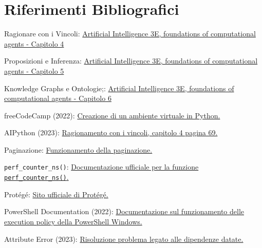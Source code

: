 \documentclass[12pt, letterpaper]{article}
\begin{document}
\newpage

\section{Riferimenti Bibliografici}

\begin{thebibliography}{100}
      Ragionare con i Vincoli: \href{https://artint.info/3e/html/ArtInt3e.Ch4.html}{
            Artificial Intelligence 3E, foundations of computational agents - Capitolo 4
      }

      Proposizioni e Inferenza: \href{https://artint.info/3e/html/ArtInt3e.Ch5.html}{
            Artificial Intelligence 3E, foundations of computational agents - Capitolo 5
      }

      Knowledge Graphs e Ontologie;: \href{https://artint.info/3e/html/ArtInt3e.Ch16.html}{
            Artificial Intelligence 3E, foundations of computational agents - Capitolo 6
      }

      freeCodeCamp (2022):  \href{https://www.freecodecamp.org/news/how-to-setup-virtual-environments-in-python/}{
            Creazione di un ambiente virtuale in Python.
      }

      AIPython (2023): \href{https://artint.info/AIPython/aipython/aipython.pdf}{
            Ragionamento con i vincoli, capitolo 4 pagina 69.
      }

      Paginazione: \href{https://www.educative.io/answers/what-is-pagination}{
            Funzionamento della paginazione.
      }


      \lstinline|perf_counter_ns()|: \href{https://docs.python.org/3/library/time.html#time.perf_counter_ns}{
            Documentazione ufficiale per la funzione \lstinline|perf_counter_ns()|.
      }

      Protégé: \href{https://protege.stanford.edu/}{Sito ufficiale di Protégé.}


      PowerShell Documentation (2022):
      \href{https://learn.microsoft.com/en-gb/powershell/module/microsoft.powershell.core/about/about_execution_policies?view=powershell-7.4}{
            Documentazione sul funzionamento delle execution policy della PowerShell Windows.
      }

      Attribute Error (2023): \href{https://stackoverflow.com/questions/70749690/attributeerror-module-collections-has-no-attribute-mapping}{
            Risoluzione problema legato alle dipendenze datate.
      }
\end{thebibliography}
\end{document}
